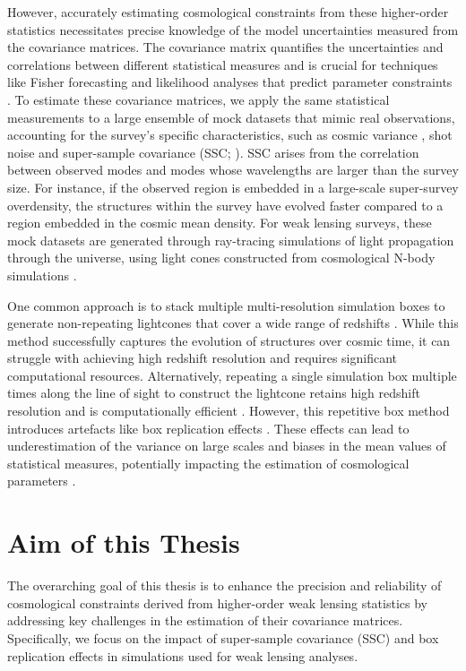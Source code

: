 However, accurately estimating cosmological constraints from these higher-order statistics necessitates precise knowledge of the model uncertainties measured from the covariance matrices. The covariance matrix quantifies the uncertainties and correlations between different statistical measures and is crucial for techniques like Fisher forecasting and likelihood analyses that predict parameter constraints \citep{1997PhRvL..79.3806T}. To estimate these covariance matrices, we apply the same statistical measurements to a large ensemble of mock datasets that mimic real observations, accounting for the survey's specific characteristics, such as cosmic variance \citep{PhysRevLett.102.021302}, shot noise \citep{2019MNRAS.490.2606W} and super-sample covariance (SSC; \citealt{PhysRevD.87.123504}). SSC arises from the correlation between observed modes and modes whose wavelengths are larger than the survey size. For instance, if the observed region is embedded in a large-scale super-survey overdensity, the structures within the survey have evolved faster compared to a region embedded in the cosmic mean density. For weak lensing surveys, these mock datasets are generated through ray-tracing simulations of light propagation through the universe, using light cones constructed from cosmological N-body simulations \citep{2019MNRAS.486...52S, 2024arXiv240513495E}.

One common approach is to stack multiple multi-resolution simulation boxes to generate non-repeating lightcones that cover a wide range of redshifts \citep{2015MNRAS.448.2987F, 2015MNRAS.453.1513C, 2017ApJ...850...24T, 2019ApJ...875...69D}. While this method successfully captures the evolution of structures over cosmic time, it can struggle with achieving high redshift resolution and requires significant computational resources. Alternatively, repeating a single simulation box multiple times along the line of sight to construct the lightcone retains high redshift resolution and is computationally efficient \citep{2010ApJ...709..920S, 2018JCAP...03..049L, 2020JCAP...10..012S, 2024MNRAS.530.5030O}. However, this repetitive box method introduces artefacts like box replication effects \citep{2024MNRAS.534.1205C}. These effects can lead to underestimation of the variance on large scales and biases in the mean values of statistical measures, potentially impacting the estimation of cosmological parameters \citep{2021JCAP...01..028Z}.

\section{Aim of this Thesis}
The overarching goal of this thesis is to enhance the precision and reliability of cosmological constraints derived from higher-order weak lensing statistics by addressing key challenges in the estimation of their covariance matrices. Specifically, we focus on the impact of super-sample covariance (SSC) and box replication effects in simulations used for weak lensing analyses.

